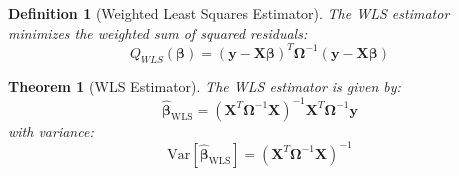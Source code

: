\documentclass{article}
\newtheorem{definition}{Definition}
\newtheorem{theorem}{Theorem}
\begin{document}
\begin{definition}[Weighted Least Squares Estimator]
The WLS estimator minimizes the weighted sum of squared residuals:
\begin{equation}
Q_{WLS}(\boldsymbol{\beta}) = (\mathbf{y} - \mathbf{X}\boldsymbol{\beta})^T\boldsymbol{\Omega}^{-1}(\mathbf{y} - \mathbf{X}\boldsymbol{\beta})
\end{equation}
\end{definition}

\begin{theorem}[WLS Estimator]
The WLS estimator is given by:
\begin{equation}
\hat{\boldsymbol{\beta}}_{\text{WLS}} = (\mathbf{X}^T\boldsymbol{\Omega}^{-1}\mathbf{X})^{-1}\mathbf{X}^T\boldsymbol{\Omega}^{-1}\mathbf{y}
\end{equation}
with variance:
\begin{equation}
\text{Var}[\hat{\boldsymbol{\beta}}_{\text{WLS}}] = (\mathbf{X}^T\boldsymbol{\Omega}^{-1}\mathbf{X})^{-1}
\end{equation}
\end{theorem}
\end{document}
